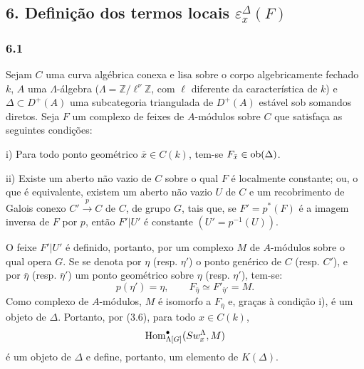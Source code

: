 \subsection*{6. Definição dos termos locais $\varepsilon_x^\Delta(F)$}

\subsubsection*{6.1}

Sejam $C$ uma curva algébrica conexa e lisa sobre o corpo algebricamente fechado $k$, $A$ uma $\Lambda$-álgebra ($\Lambda=\mathbb Z/\ell^\nu\mathbb Z$, com $\ell$ diferente da característica de $k$) e $\Delta\subset D^+(A)$ uma subcategoria triangulada de $D^+(A)$ estável sob somandos diretos. Seja $F$ um complexo de feixes de $A$-módulos sobre $C$ que satisfaça as seguintes condições:

i) Para todo ponto geométrico $\bar x\in C(k)$, tem-se $F_{\bar x}\in\operatorname{ob}(\Delta)$.

ii) Existe um aberto não vazio de $C$ sobre o qual $F$ é localmente constante; ou, o que é equivalente, existem um aberto não vazio $U$ de $C$ e um recobrimento de Galois conexo $C'\xrightarrow{p}C$ de $C$, de grupo $G$, tais que, se $F'=p^*(F)$ é a imagem inversa de $F$ por $p$, então $F'|U'$ é constante $(U'=p^{-1}(U))$.

O feixe $F'|U'$ é definido, portanto, por um complexo $M$ de $A$-módulos sobre o qual opera $G$. Se se denota por $\eta$ (resp. $\eta'$) o ponto genérico de $C$ (resp. $C'$), e por $\bar\eta$ (resp. $\bar\eta'$) um ponto geométrico sobre $\eta$ (resp. $\eta'$), tem-se:
\[
p(\eta')=\eta,\qquad
F_{\bar\eta}\simeq F'_{\bar\eta'}=M.
\tag{6.1.1}
\]
Como complexo de $A$-módulos, $M$ é isomorfo a $F_{\bar\eta}$ e, graças à condição i), é um objeto de $\Delta$. Portanto, por (3.6), para todo $x\in C(k)$,
\[
\operatorname{Hom}^\bullet_{\Lambda[G]}(Sw_x^\Lambda,M)
\]
é um objeto de $\Delta$ e define, portanto, um elemento de $K(\Delta)$.
